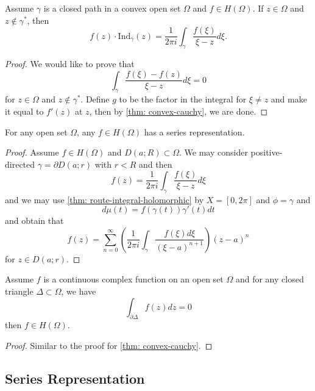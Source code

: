\begin{theorem}
     Assume $\gamma$ is a closed path in a convex open set $\Omega$ and $f\in H(\Omega)$. If $z\in \Omega$ and $z\notin \gamma^*$, then
    \[f(z)\cdot \text{Ind}_{\gamma}(z) = \dfrac{1}{2\pi i}\int_{\gamma}\dfrac{f(\xi)}{\xi - z}d\xi.\]
\end{theorem}
\begin{proof}
    We would like to prove that
    \[
    \int_{\gamma} \dfrac{f(\xi)-f(z)}{\xi-z}d\xi = 0
    \]
    for $z\in \Omega$ and $z\notin \gamma^*$. Define $g$ to be the factor in the integral for $\xi \neq z$ and make it equal to $f'(z)$ at $z$, then by \ref{thm: convex-cauchy}, we are done.
\end{proof}

\begin{theorem}
\label{thm: cauchy-formula}
    For any open set $\Omega$, any $f\in H(\Omega)$ has a series representation.
\end{theorem}
\begin{proof}
    Assume $f\in H(\Omega)$ and $D(a;R) \subset \Omega$. We may consider positive-directed $\gamma = \partial D(a;r)$ with $r<R$ and then
    \[
    f(z) = \dfrac{1}{2\pi i}\int_{\gamma}\dfrac{f(\xi)}{\xi - z}d\xi
    \]
    and we may use \ref{thm: route-integral-holomorphic} by $X = [0,2\pi]$ and $\phi = \gamma$ and
    \[d\mu(t) = f(\gamma(t))\gamma'(t)dt\]
    and obtain that
    \[
    f(z) =  \sum\limits_{n=0}^{\infty}\left(\dfrac{1}{2\pi i}\int_\gamma\dfrac{f(\xi)d\xi}{(\xi - a)^{n+1}}\right)(z-a)^n
    \]
    for $z\in D(a;r)$.
\end{proof}

\begin{theorem}\label{thm: morera-thm}
    Assume $f$ is a continuous complex function on an open set $\Omega$ and for any closed triangle $\Delta\subset \Omega$, we have
    \[
    \int_{\partial \Delta} f(z) dz = 0
    \]
    then $f\in H(\Omega)$.
\end{theorem}
\begin{proof}
    Similar to the proof for \ref{thm: convex-cauchy}.
\end{proof}

\subsection{Series Representation}

